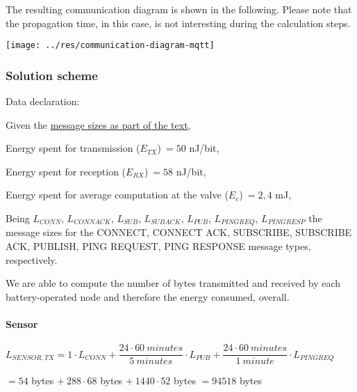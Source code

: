 \documentclass[a4paper,11pt]{article} %
\begin{document}
    The resulting communication diagram is shown in the following.
    Please note that the propagation time, in this case, is not interesting during the calculation steps.

    \begin{center}
        \texttt{[image: ../res/communication-diagram-mqtt]}
    \end{center}

    \subsubsection{Solution scheme}

    Data declaration:

    \medskip

    Given the \hyperref[message-sizes-table]{message sizes as part of the text},

    \smallskip

    Energy spent for transmission ($E_{TX}$)$\ = 50$ nJ/bit,

    \smallskip

    Energy spent for reception ($E_{RX}$)$\ = 58$ nJ/bit,

    \smallskip

    Energy spent for average computation at the valve ($E_c$)$\ = 2,4$ mJ,

    \smallskip

    Being $L_{CONN}$, $L_{CONNACK}$, $L_{SUB}$, $L_{SUBACK}$, $L_{PUB}$, $L_{PINGREQ}$, $L_{PINGRESP}$ the message sizes for the \textsc{CONNECT}, \textsc{CONNECT ACK}, \textsc{SUBSCRIBE}, \textsc{SUBSCRIBE ACK}, \textsc{PUBLISH}, \textsc{PING REQUEST}, \textsc{PING RESPONSE} message types, respectively.

    \bigskip

    We are able to compute the number of bytes transmitted and received by each battery-operated node and therefore the energy consumed, overall.

    \paragraph{Sensor}

    $L_{SENSOR, TX} = 1 \cdot L_{CONN} + \dfrac{24 \cdot 60\ minutes}{5\ minutes} \cdot L_{PUB} + \dfrac{24 \cdot 60\ minutes}{1\ minute} \cdot L_{PINGREQ}$

    \medskip

    \qquad \qquad \qquad $ = 54$ bytes $+\ 288 \cdot 68$ bytes $+\ 1440 \cdot 52$ bytes $ = 94518$ bytes
\end{document}

